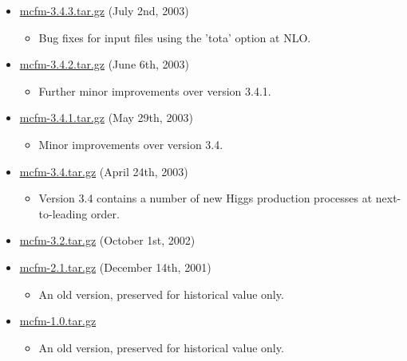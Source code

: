 \begin{itemize}
\item \href{https://mcfm.fnal.gov/downloads/mcfm-3.4.3.tar.gz}{mcfm-3.4.3.tar.gz} (July 2nd, 2003)
\begin{itemize}
\item Bug fixes for input files using the 'tota' option at NLO.
\end{itemize}

\item \href{https://mcfm.fnal.gov/downloads/mcfm-3.4.2.tar.gz}{mcfm-3.4.2.tar.gz} (June 6th, 2003)
\begin{itemize}
\item Further minor improvements over version 3.4.1.
\end{itemize}

\item \href{https://mcfm.fnal.gov/downloads/mcfm-3.4.1.tar.gz}{mcfm-3.4.1.tar.gz} (May 29th, 2003)
\begin{itemize}
\item Minor improvements over version 3.4.
\end{itemize}

\item \href{https://mcfm.fnal.gov/downloads/mcfm-3.4.tar.gz}{mcfm-3.4.tar.gz} (April 24th, 2003)
\begin{itemize}
\item Version 3.4 contains a number of new Higgs production processes at next-to-leading order.
\end{itemize}

\item \href{https://mcfm.fnal.gov/downloads/mcfm-3.2.tar.gz}{mcfm-3.2.tar.gz} (October 1st, 2002)

\item \href{https://mcfm.fnal.gov/downloads/mcfm-2.1.tar.gz}{mcfm-2.1.tar.gz} (December 14th, 2001)
\begin{itemize}
\item An old version, preserved for historical value only.
\end{itemize}

\item \href{https://mcfm.fnal.gov/downloads/mcfm-1.0.tar.gz}{mcfm-1.0.tar.gz}
\begin{itemize}
\item An old version, preserved for historical value only.
\end{itemize}
\end{itemize}
